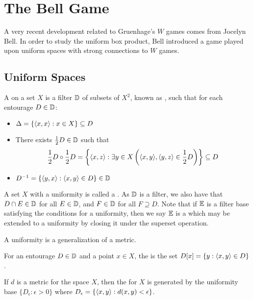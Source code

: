 
\chapter{The Bell Game}

A very recent development related to Gruenhage's $W$ games comes from
Jocelyn Bell. In order to study the uniform box product, Bell introduced
a game played upon uniform spaces with strong connections to $W$ games.

\section{Uniform Spaces}

\begin{defn}
  A  on a set $X$ is a filter $\mathbb{D}$ of subsets of $X^2$,
  known as , such that for each entourage $D\in\mathbb{D}$:
  \begin{itemize}
    \item $\Delta=\{\langle x,x\rangle:x\in X\}\subseteq D$
    \item There exists $\frac{1}{2}D\in\mathbb{D}$ such that
      \[
        \frac{1}{2}D\circ\frac{1}{2}D
          =
        \left\{\langle x,z\rangle:\exists y\in X\left(\langle x,y\rangle,\langle y,z\rangle\in\frac{1}{2}D\right)\right\}
          \subseteq
        D
      \]
    \item $D^{-1}=\{\langle y,x\rangle:\langle x,y\rangle\in D\}\in \mathbb{D}$
  \end{itemize}
\end{defn}

A set $X$ with a uniformity is called a .
As $\mathbb{D}$ is a filter, we also have that $D\cap E\in \mathbb{D}$ for all
$E\in\mathbb{D}$, and $F\in \mathbb{D}$ for all $F\supseteq D$. Note that if $\mathbb{E}$ is
a filter base satisfying the conditions for a uniformity, then we say
$\mathbb{E}$ is a  which may be extended to a uniformity by
closing it under the superset operation.

A uniformity is a generalization of a metric.

\begin{defn}
  For an entourage $D\in\mathbb{D}$ and a point $x\in X$, the
   is the set $D[x]=\{y:\langle x,y\rangle\in D\}$.
\end{defn}

\begin{defn}
  If $d$ is a metric for the space $X$, then the  for
  $X$ is generated by the uniformity base $\{D_\epsilon:\epsilon>0\}$
  where $D_\epsilon = \{\langle x,y\rangle:d(x,y)<\epsilon\}$.
\end{defn}

